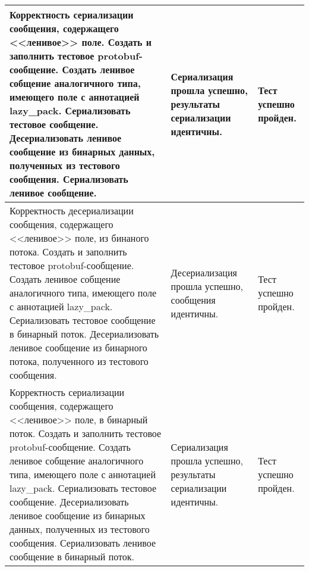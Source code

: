 \begin{longtable}{
    | >{\raggedright\arraybackslash}p{}
    | >{\raggedright\arraybackslash}p{}
    | >{\raggedright\arraybackslash}p{}|}
    Корректность сериализации сообщения, содержащего <<ленивое>> поле.
    \newline \newline
    Создать и заполнить тестовое protobuf-сообщение. \newline
    Создать ленивое собщение аналогичного типа, имеющего поле с аннотацией lazy\_pack. \newline
    Сериализовать тестовое сообщение. \newline
    Десериализовать ленивое сообщение из бинарных данных, полученных из тестового сообщения. \newline
    Сериализовать ленивое сообщение. &
    Сериализация прошла успешно, результаты сериализации идентичны. &
    Тест успешно пройден. \\
    \hline

    Корректность десериализации сообщения, содержащего <<ленивое>> поле, из бинаного потока.
    \newline \newline
    Создать и заполнить тестовое protobuf-сообщение. \newline
    Создать ленивое собщение аналогичного типа, имеющего поле с аннотацией lazy\_pack. \newline
    Сериализовать тестовое сообщение в бинарный поток. \newline
    Десериализовать ленивое сообщение из бинарного потока, полученного из тестового сообщения. &
    Десериализация прошла успешно, сообщения идентичны. &
    Тест успешно пройден. \\
    \hline

    Корректность сериализации сообщения, содержащего <<ленивое>> поле, в бинарный поток.
    \newline \newline
    Создать и заполнить тестовое protobuf-сообщение. \newline
    Создать ленивое собщение аналогичного типа, имеющего поле с аннотацией lazy\_pack. \newline
    Сериализовать тестовое сообщение. \newline
    Десериализовать ленивое сообщение из бинарных данных, полученных из тестового сообщения. \newline
    Сериализовать ленивое сообщение в бинарный поток. &
    Сериализация прошла успешно, результаты сериализации идентичны. &
    Тест успешно пройден. \\
    \hline


\end{longtable}
